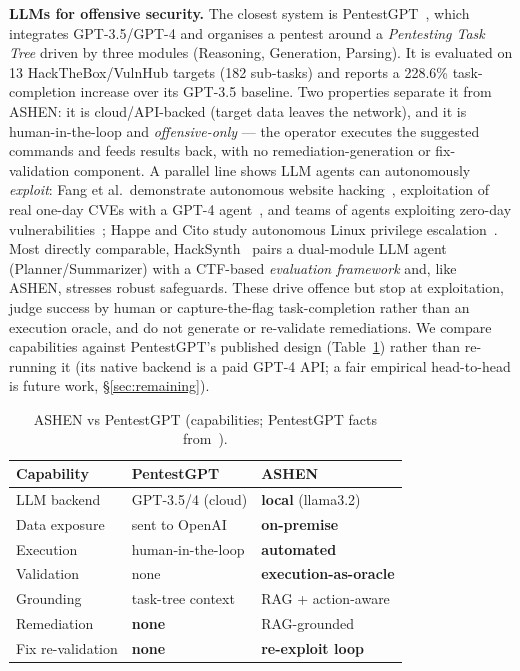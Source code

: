 \documentclass[conference]{IEEEtran}
\begin{document}
\textbf{LLMs for offensive security.} The closest system is
PentestGPT~\cite{pentestgpt}, which integrates GPT-3.5/GPT-4 and organises a
pentest around a \emph{Pentesting Task Tree} driven by three modules (Reasoning,
Generation, Parsing). It is evaluated on 13 HackTheBox/VulnHub targets (182
sub-tasks) and reports a 228.6\% task-completion increase over its GPT-3.5
baseline. Two properties separate it from ASHEN: it is cloud/API-backed (target
data leaves the network), and it is human-in-the-loop and \emph{offensive-only} ---
the operator executes the suggested commands and feeds results back, with no
remediation-generation or fix-validation component. A parallel line shows LLM
agents can autonomously \emph{exploit}: Fang et al.\ demonstrate autonomous
website hacking~\cite{fangweb}, exploitation of real one-day CVEs with a GPT-4
agent~\cite{fangoneday}, and teams of agents exploiting zero-day
vulnerabilities~\cite{fangzeroday}; Happe and Cito study autonomous Linux
privilege escalation~\cite{happe}. Most directly comparable, HackSynth~\cite{hacksynth}
pairs a dual-module LLM agent (Planner/Summarizer) with a CTF-based \emph{evaluation
framework} and, like ASHEN, stresses robust safeguards. These drive offence but
stop at exploitation, judge success by human or capture-the-flag task-completion
rather than an execution oracle, and do not generate or re-validate remediations. We compare capabilities against PentestGPT's published
design (Table~\ref{tab:pgpt}) rather than re-running it (its native backend is a
paid GPT-4 API; a fair empirical head-to-head is future work, \S\ref{sec:remaining}).

\begin{table}[h]
\caption{ASHEN vs PentestGPT (capabilities; PentestGPT facts from~\cite{pentestgpt}).}
\label{tab:pgpt}
\centering\footnotesize
\begin{tabular}{p{2.3cm}p{2.4cm}p{2.4cm}}
\toprule
Capability & PentestGPT & ASHEN \\
\midrule
LLM backend & GPT-3.5/4 (cloud) & \textbf{local} (llama3.2) \\
Data exposure & sent to OpenAI & \textbf{on-premise} \\
Execution & human-in-the-loop & \textbf{automated} \\
Validation & none & \textbf{execution-as-oracle} \\
Grounding & task-tree context & RAG + action-aware \\
Remediation & \textbf{none} & RAG-grounded \\
Fix re-validation & \textbf{none} & \textbf{re-exploit loop} \\
\bottomrule
\end{tabular}
\end{table}
\end{document}
